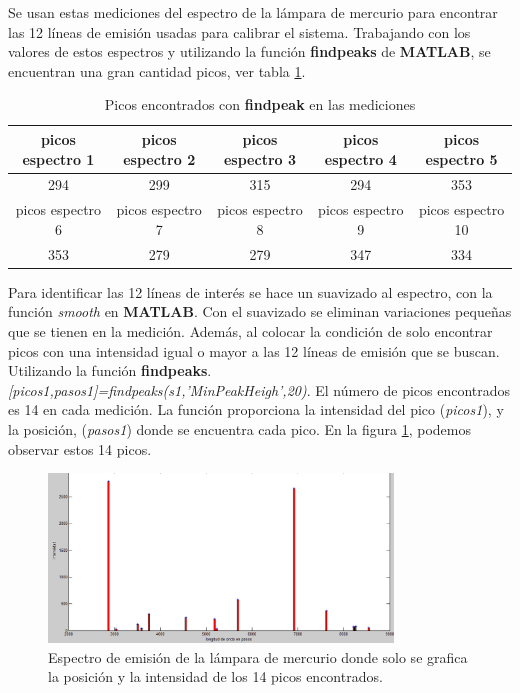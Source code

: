 Se usan estas mediciones del espectro de la lámpara de mercurio para encontrar las 12 líneas de emisión usadas para calibrar el sistema.
Trabajando con los valores de estos espectros y utilizando la función \textbf{findpeaks} de \textbf{MATLAB}, se encuentran una gran cantidad  picos, ver tabla \ref{tabla:picos01}. 
\begin{table}[h]
	\centering
	\caption{Picos encontrados con \textbf{findpeak} en las mediciones}
	\label{tabla:picos01}
\begin{tabular}{|c|c|c|c|c|}
	\hline 
	picos espectro 1 & picos espectro 2 & picos espectro 3 & picos espectro 4 & picos espectro 5 \\ 
	\hline 
	294 & 299 & 315 & 294 & 353 \\ 
	\hline 
	picos espectro 6 & picos espectro 7 & picos espectro 8 & picos espectro 9 & picos espectro 10 \\ 
	\hline 
	353 & 279 & 279 & 347 & 334 \\ 
	\hline 
\end{tabular} 

\end{table}

Para identificar las 12 líneas de interés se hace un suavizado al espectro, con la función \textit{smooth} en \textbf{MATLAB}. Con el suavizado se eliminan variaciones pequeñas que se tienen en la medición. Además, al colocar la condición de solo encontrar picos con una intensidad igual o mayor a las 12 líneas de emisión que se buscan. Utilizando la función \textbf{findpeaks}. \textit{[picos1,pasos1]=findpeaks(s1,'MinPeakHeigh',20)}. El número de picos encontrados es 14 en cada medición. La función proporciona la intensidad del pico (\textit{picos1}), y la posición, (\textit{pasos1}) donde se encuentra cada pico. 
En la figura \ref{fig:picos14}, podemos observar estos 14 picos.

\begin{figure}[h]
	\centering
	\includegraphics[width=0.9\linewidth, height=4.5cm]{Imagenes/3/picos14}
	
	\caption[Espectro de emisión de la lámpara de mercurio, espectro en intensidad contra pasos.]{Espectro de emisión de la lámpara de mercurio donde solo se grafica la posición y la intensidad de los 14 picos encontrados.}
	\label{fig:picos14}
\end{figure}

